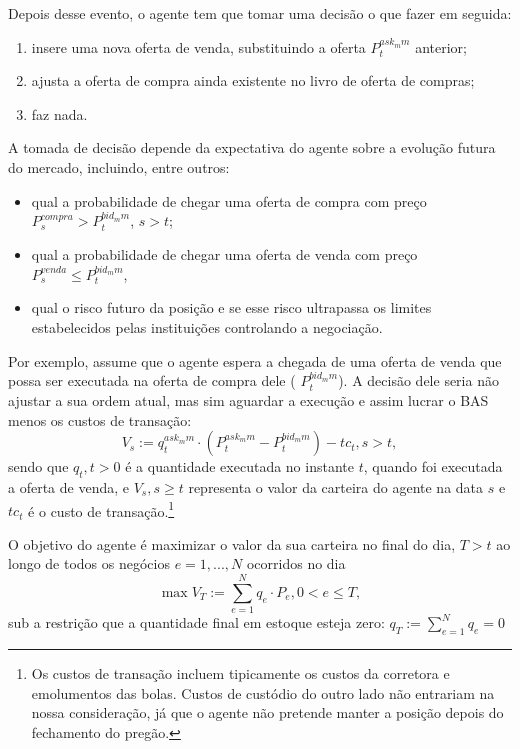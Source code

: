 Depois desse evento, o agente tem que tomar uma decisão o que fazer em seguida:
\begin{enumerate}
    \item insere uma nova oferta de venda, substituindo a oferta $P_t^{ask_mm}$ anterior;
    \item ajusta a oferta de compra ainda existente no livro de oferta de compras;
    \item faz nada.
\end{enumerate}

A tomada de decisão depende da expectativa do agente sobre a evolução futura do mercado, incluindo, entre outros:
\begin{itemize}
    \item qual a probabilidade de chegar uma oferta de compra com preço $P_s^{compra} > P_t^{bid_mm}$, $s >t$;
    \item qual a probabilidade de chegar uma oferta de venda com preço $P_s^{venda} \leq P_t^{bid_mm}$,
    \item qual o risco futuro da posição e se esse risco ultrapassa os limites estabelecidos pelas instituições controlando a negociação.
\end{itemize}

Por exemplo, assume que o agente espera a chegada de uma oferta de venda que possa ser executada na oferta de compra dele ( $P_t^{bid_mm}$). A decisão dele seria não ajustar a sua ordem atual, mas sim aguardar a execução e assim lucrar o BAS menos os custos de transação:
\begin{equation*}
    V_s := q_t^{ask_mm} \cdot \left(P_t^{ask_mm} - P_t^{bid_mm}\right) - tc_t, s> t,
\end{equation*}
sendo que $q_t, t>0$ é a quantidade executada no instante $t$, quando foi executada a oferta de venda, e $V_s, s\geq t$ representa o valor da carteira do agente na data $s$ e $tc_t$ é o custo de transação.\footnote{Os custos de transação incluem tipicamente os custos da corretora e emolumentos das bolas. Custos de custódio do outro lado não entrariam na nossa consideração, já que o agente não pretende manter a posição depois do fechamento do pregão. }

O objetivo do agente é maximizar o valor da sua carteira no final do dia, $T>t$ ao longo de todos os negócios $e=1,...,N$ ocorridos no dia
\begin{equation*}
    \max V_T := \sum_{e=1}^N q_e \cdot P_e, 0<e\leq T, 
\end{equation*}
sub a restrição que a quantidade final em estoque esteja zero: $q_T:= \sum_{e=1}^N q_e = 0$

